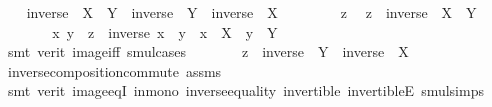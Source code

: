 \begin{isabellebody}
%
\isadelimproof
%
\endisadelimproof
%
\isatagproof
{}\isamarkupfalse%
\isanewline
\ \ \isamarkupfalse%
\ {\isachardoublequoteopen}inverse\ {\isacharbackquote}{\kern0pt}\ {\isacharparenleft}{\kern0pt}X\ {\isasymcdots}\ Y{\isacharparenright}{\kern0pt}\ {\isasymsubseteq}\ {\isacharparenleft}{\kern0pt}inverse\ {\isacharbackquote}{\kern0pt}\ Y{\isacharparenright}{\kern0pt}\ {\isasymcdots}\ {\isacharparenleft}{\kern0pt}inverse\ {\isacharbackquote}{\kern0pt}\ X{\isacharparenright}{\kern0pt}{\isachardoublequoteclose}\isanewline
\ \ \isamarkupfalse%
\isanewline
\ \ \ \ \isamarkupfalse%
\ z\ \isamarkupfalse%
\ {\isachardoublequoteopen}z\ {\isasymin}\ inverse\ {\isacharbackquote}{\kern0pt}\ {\isacharparenleft}{\kern0pt}X\ {\isasymcdots}\ Y{\isacharparenright}{\kern0pt}{\isachardoublequoteclose}\isanewline
\ \ \ \ \isamarkupfalse%
\ \isamarkupfalse%
\ x\ y\ \ {\isachardoublequoteopen}z\ {\isacharequal}{\kern0pt}\ inverse\ {\isacharparenleft}{\kern0pt}x\ {\isasymcdot}\ y{\isacharparenright}{\kern0pt}{\isachardoublequoteclose}\ \ {\isachardoublequoteopen}x\ {\isasymin}\ X{\isachardoublequoteclose}\ \ {\isachardoublequoteopen}y\ {\isasymin}\ Y{\isachardoublequoteclose}\ \isanewline
\ \ \ \ \ \ \isamarkupfalse%
\ {\isacharparenleft}{\kern0pt}smt\ {\isacharparenleft}{\kern0pt}verit{\isacharparenright}{\kern0pt}\ image{\isacharunderscore}{\kern0pt}iff\ smul{\isachardot}{\kern0pt}cases{\isacharparenright}{\kern0pt}\isanewline
\ \ \ \ \isamarkupfalse%
\ \isamarkupfalse%
\ {\isachardoublequoteopen}z\ {\isasymin}\ {\isacharparenleft}{\kern0pt}inverse\ {\isacharbackquote}{\kern0pt}\ Y{\isacharparenright}{\kern0pt}\ {\isasymcdots}\ {\isacharparenleft}{\kern0pt}inverse\ {\isacharbackquote}{\kern0pt}\ X{\isacharparenright}{\kern0pt}{\isachardoublequoteclose}\ \isanewline
\ \ \ \ \ \ \isamarkupfalse%
\ inverse{\isacharunderscore}{\kern0pt}composition{\isacharunderscore}{\kern0pt}commute\ assms\ \isanewline
\ \ \ \ \ \ \isamarkupfalse%
\ {\isacharparenleft}{\kern0pt}smt\ {\isacharparenleft}{\kern0pt}verit{\isacharparenright}{\kern0pt}\ image{\isacharunderscore}{\kern0pt}eqI\ in{\isacharunderscore}{\kern0pt}mono\ inverse{\isacharunderscore}{\kern0pt}equality\ invertible\ invertibleE\ smul{\isachardot}{\kern0pt}simps{\isacharparenright}{\kern0pt}\isanewline
\ \ \isamarkupfalse%
\isanewline
\ \ \isamarkupfalse%

\end{isabellebody}
